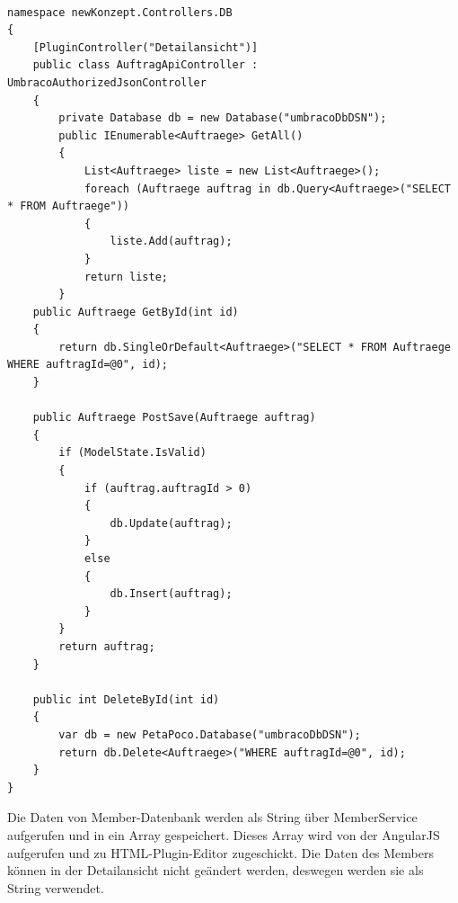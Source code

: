 \begin{lstlisting}[caption={API-UmbracoAuthorizedJsonController}, label=lst:API-Controller]

namespace newKonzept.Controllers.DB
{
	[PluginController("Detailansicht")]
	public class AuftragApiController : UmbracoAuthorizedJsonController
	{
		private Database db = new Database("umbracoDbDSN");
		public IEnumerable<Auftraege> GetAll()
		{
			List<Auftraege> liste = new List<Auftraege>();
			foreach (Auftraege auftrag in db.Query<Auftraege>("SELECT * FROM Auftraege"))
			{
				liste.Add(auftrag);
			}
			return liste;
		}
	public Auftraege GetById(int id)
	{
		return db.SingleOrDefault<Auftraege>("SELECT * FROM Auftraege WHERE auftragId=@0", id);
	}

	public Auftraege PostSave(Auftraege auftrag)
	{
		if (ModelState.IsValid)
		{			
			if (auftrag.auftragId > 0)
			{
				db.Update(auftrag);
			}
			else
			{
				db.Insert(auftrag);
			}
		}
		return auftrag;
	}

	public int DeleteById(int id)
	{
		var db = new PetaPoco.Database("umbracoDbDSN");
		return db.Delete<Auftraege>("WHERE auftragId=@0", id);
	}
}
\end{lstlisting}

Die Daten von Member-Datenbank werden als String über MemberService aufgerufen und in ein Array gespeichert. Dieses Array wird von der AngularJS aufgerufen und zu HTML-Plugin-Editor zugeschickt. Die Daten des Members können in der Detailansicht nicht geändert werden, deswegen werden sie als String verwendet.